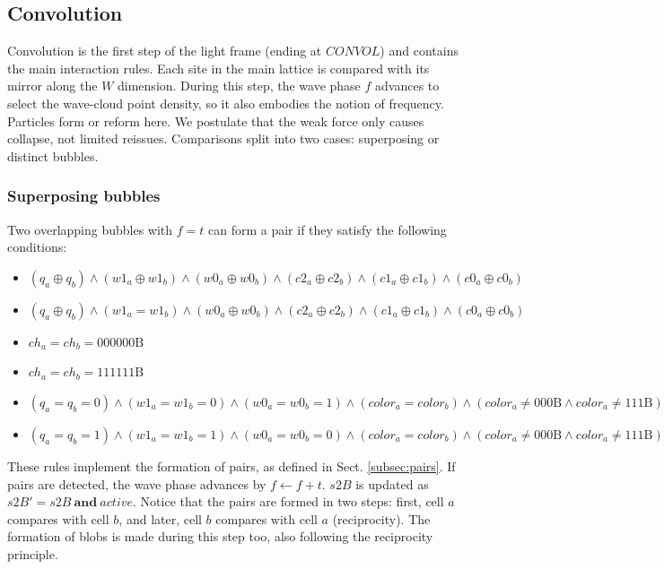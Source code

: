 \documentclass{ijuc}
\begin{document}
\subsection{Convolution} \label{subsec:convolution}
Convolution is the first step of the light frame (ending at $CONVOL$) and contains the main interaction rules. Each site in the main lattice is compared with its mirror along the $W$ dimension. During this step, the wave phase $f$ advances to select the wave-cloud point density, so it also embodies the notion of frequency. Particles form or reform here. We postulate that the weak force only causes collapse, not limited reissues. Comparisons split into two cases: superposing or distinct bubbles.

\subsubsection{Superposing bubbles}
Two overlapping bubbles with $f=t$ can form a pair if they satisfy the following conditions:
\begin{itemize}
\item
$ (q_a \oplus q_b) \land (w1_a \oplus w1_b) \land (w0_a \oplus w0_b) \land (c2_a \oplus c2_b) \land (c1_a \oplus c1_b) \land (c0_a \oplus c0_b) $
\item

$ (q_a \oplus q_b) \land (w1_a = w1_b) \land (w0_a \oplus w0_b) \land (c2_a \oplus c2_b) \land (c1_a \oplus c1_b) \land (c0_a \oplus c0_b) $
\item

$ ch_a = ch_b = 000000\mathrm{B} $
\item

$ ch_a = ch_b = 111111\mathrm{B} $
\item

$ (q_a = q_b = 0) \land (w1_a = w1_b = 0) \land (w0_a = w0_b = 1) \land (color_a = color_b) \land (color_a \neq 000\mathrm{B} \land color_a \neq 111\mathrm{B}) $
\item

$ (q_a = q_b = 1) \land (w1_a = w1_b = 1) \land (w0_a = w0_b = 0) \land (color_a = color_b) \land (color_a \neq 000\mathrm{B} \land color_a \neq 111\mathrm{B}) $

\end{itemize}

These rules implement the formation of pairs, as defined in Sect. \ref{subsec:pairs}. 
If pairs are detected, the wave phase advances by $f \leftarrow f + t$.
$s2B$ is updated as $s2B' = s2B \ \textbf{and} \ \mathit{active}$. 
Notice that the pairs are formed in two steps: first, cell $a$ compares with cell $b$, and later, cell $b$ compares with cell $a$ (reciprocity).
The formation of blobs is made during this step too, also following the reciprocity principle. 
\end{document}
